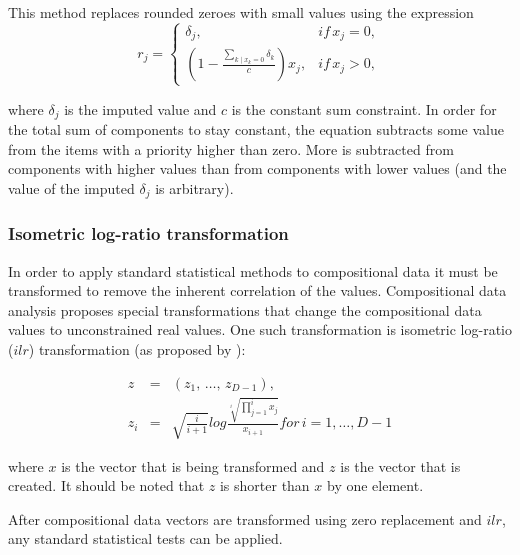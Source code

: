 This method replaces rounded zeroes with small values using the expression
\begin{equation}
r_{j}=\begin{cases}
\delta_{j}, & if\, x_{j}=0,\\
(1-\frac{\sum_{k\mid x_{k}=0}\delta_{k}}{c})x_{j}, & if\, x_{j}>0,\end{cases}\label{eq:zero-replace}
\end{equation}

where $\delta_{j}$ is the imputed value and $c$ is the constant sum constraint.
In order for the total sum of components to stay constant, the equation subtracts 
some value from the items with a priority higher than zero.
More is subtracted from components with higher values than from components with lower 
values (and the value of the imputed $\delta_{j}$ is arbitrary).

\subsubsection{\label{Isometric-Logratio-Transformation}Isometric log-ratio transformation}
In order to apply standard statistical methods to compositional data it must be transformed to remove the inherent correlation of the values.
Compositional data analysis proposes special transformations that change the compositional data values to unconstrained real values.
One such transformation is isometric log-ratio ($ilr$) transformation (as proposed by \cite{Pawlowsky-Glahn2006,Filzmoser2007a}):

\begin{eqnarray}
z & = & \left(z_{1},\,\ldots,\, z_{D-1}\right),\nonumber \\
z_{i} & = & \sqrt{\frac{i}{i+1}}log\frac{\sqrt[i]{\prod_{j=1}^{i}x_{j}}}{x_{i+1}}for\, i=1,\ldots,D-1\label{eq:ilr}
\end{eqnarray}

where $x$ is the vector that is being transformed and $z$ is the vector that is created. It should be noted that $z$ is shorter than $x$ by one element.

After compositional data vectors are transformed using zero replacement and $ilr$, any standard statistical tests can be applied.